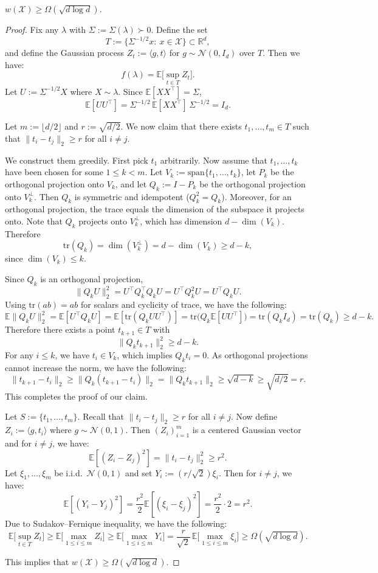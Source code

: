 \begin{proposition}
    $w(\mathcal{X})\geq \Omega(\sqrt{d\log d})$.
\end{proposition}
\begin{proof}
Fix any $\lambda$ with $\Sigma:=\Sigma(\lambda)\succ 0$.
Define the set
\[
T := \{\Sigma^{-1/2}x:\ x\in\mathcal X\}\subset\mathbb R^d,
\]
and define the Gaussian process $Z_t:=\langle g,t\rangle$ for $g\sim\mathcal N(0,I_d)$ over $T$.
Then we have:
\[
f(\lambda)=\mathbb E\Big[\sup_{t\in T} Z_t\Big].
\]
Let $U:=\Sigma^{-1/2}X$ where $X\sim\lambda$. Since $\mathbb E[XX^\top]=\Sigma$,
\[
\mathbb E[UU^\top]=\Sigma^{-1/2}\,\mathbb E[XX^\top]\,\Sigma^{-1/2}=I_d.
\]


Let $m:=\lfloor d/2\rfloor$ and $r:=\sqrt{d/2}$.
We now claim that there exists $t_1,\dots,t_m\in T$ such that $\|t_i-t_j\|_2\ge r$ for all $i\ne j$.

We construct them greedily. First pick $t_1$ arbitrarily. Now assume that $t_1,\dots,t_k$ have been chosen for some $1\le k<m$.
Let $V_k:=\mathrm{span}\{t_1,\dots,t_k\}$, let $P_k$ be the orthogonal projection onto $V_k$,
and let $Q_k:=I-P_k$ be the orthogonal projection onto $V_k^\perp$.
Then $Q_k$ is symmetric and idempotent ($Q_k^2=Q_k$). Moreover, for an orthogonal projection, the trace equals the dimension of the subspace it projects onto. Note that $Q_k$ projects onto $V_k^\perp$, which has dimension $d-\dim(V_k)$. Therefore
\[
\mathrm{tr}(Q_k)=\dim(V_k^\perp)=d-\dim(V_k)\ge d-k,
\]
since $\dim(V_k)\le k$.

Since $Q_k$ is an orthogonal projection,
\[
\|Q_k U\|_2^2 = U^\top Q_k^\top Q_k U=U^\top Q_k^2 U= U^\top Q_k U.
\]
Using $\mathrm{tr}(ab)=ab$ for scalars and cyclicity of trace, we have the following:
\[
\mathbb E\|Q_k U\|_2^2
= \mathbb E[U^\top Q_k U]
= \mathbb E[\mathrm{tr}(Q_k U U^\top)]
= \mathrm{tr}\big(Q_k \mathbb E[UU^\top]\big)
= \mathrm{tr}(Q_k I_d)
= \mathrm{tr}(Q_k)
\ge d-k.
\]
Therefore there exists a point $t_{k+1}\in T$ with
\[
\|Q_k t_{k+1}\|_2^2 \ge d-k.
\]
For any $i\le k$, we have $t_i\in V_k$, which implies $Q_k t_i=0$. As orthogonal projections cannot increase the norm, we have the following:
\[
\|t_{k+1}-t_i\|_2 \ge \|Q_k(t_{k+1}-t_i)\|_2
= \|Q_k t_{k+1}\|_2
\ge \sqrt{d-k}
\ge \sqrt{d/2}=r.
\]
This completes the proof of our claim.


Let $S:=\{t_1,\dots,t_m\}$. Recall that $\|t_i-t_j\|_2\ge r$ for all $i\neq j$.
Now define $Z_i:=\langle g,t_i\rangle$ where $g\sim \mathcal{N}(0,1)$.
Then $(Z_i)_{i=1}^m$ is a centered Gaussian vector and for $i\ne j$, we have:
\[
\mathbb E[(Z_i-Z_j)^2] = \|t_i-t_j\|_2^2 \ge r^2.
\]
Let $\xi_1,\dots,\xi_m$ be i.i.d.\ $\mathcal N(0,1)$ and set $Y_i:=(r/\sqrt{2})\xi_i$.
Then for $i\ne j$, we have:
\[
\mathbb E[(Y_i-Y_j)^2] = \frac{r^2}{2}\mathbb E[(\xi_i-\xi_j)^2]=\frac{r^2}{2}\cdot 2=r^2.
\]
Due to Sudakov–Fernique inequality, we have the following:
\[
\mathbb E\Big[\sup_{t\in T} Z_t\Big]\geq\mathbb E\Big[\max_{1\le i\le m} Z_i\Big]
\ge
\mathbb E\Big[\max_{1\le i\le m} Y_i\Big]
=
\frac{r}{\sqrt{2}}\,\mathbb E\Big[\max_{1\le i\le m}\xi_i\Big]\geq \Omega(\sqrt{d\log d}).
\]

This implies that $w(\mathcal{X})\geq \Omega(\sqrt{d\log d})$.
\end{proof}

